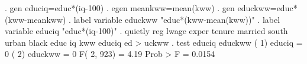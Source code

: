 . gen educiq=educ*(iq-100)
{\smallskip}
. egen meankww=mean(kww)
{\smallskip}
. gen educkww=educ*(kww-meankww)
{\smallskip}
. label variable educkww "educ*(kww-mean(kww))"
{\smallskip}
. label variable educiq "educ*(iq-100)"
{\smallskip}
. quietly reg lwage exper tenure married south urban black educ iq kww educiq ed
> uckww
{\smallskip}
. test educiq educkww
{\smallskip}
 ( 1)  educiq = 0
 ( 2)  educkww = 0
{\smallskip}
       F(  2,   923) =    4.19
            Prob > F =    0.0154
{\smallskip}
